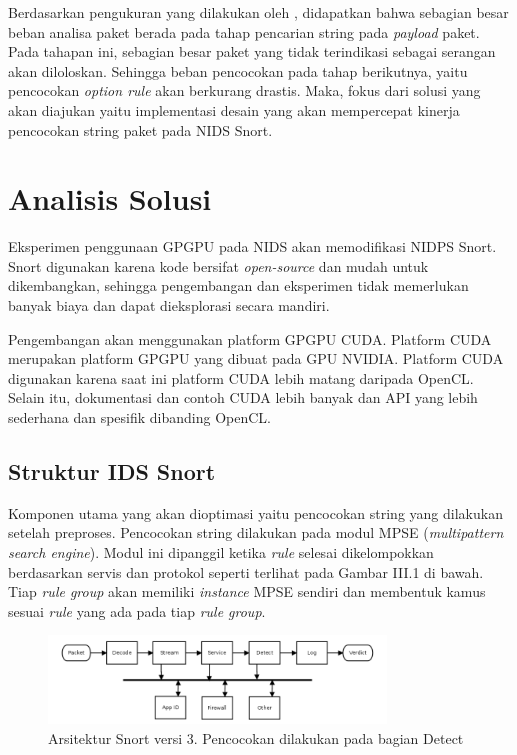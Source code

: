 
    Berdasarkan pengukuran yang dilakukan oleh \cite{kargus2012}, didapatkan bahwa sebagian besar beban analisa paket berada pada tahap pencarian string pada \emph{payload} paket. Pada tahapan ini, sebagian besar paket yang tidak terindikasi sebagai serangan akan diloloskan. Sehingga beban pencocokan pada tahap berikutnya, yaitu pencocokan \emph{option rule} akan berkurang drastis. Maka, fokus dari solusi yang akan diajukan yaitu implementasi desain yang akan mempercepat kinerja pencocokan string paket pada NIDS Snort.

  \section{Analisis Solusi}

    Eksperimen penggunaan GPGPU pada NIDS akan memodifikasi NIDPS Snort. Snort digunakan karena kode bersifat \emph{open-source} dan mudah untuk dikembangkan, sehingga pengembangan dan eksperimen tidak memerlukan banyak biaya dan dapat dieksplorasi secara mandiri. 

    Pengembangan akan menggunakan platform GPGPU CUDA. Platform CUDA merupakan platform GPGPU yang dibuat pada GPU NVIDIA. Platform CUDA digunakan karena saat ini platform CUDA lebih matang daripada OpenCL. Selain itu, dokumentasi dan contoh CUDA lebih banyak dan API yang lebih sederhana dan spesifik dibanding OpenCL.

    \subsection{Struktur IDS Snort}

      Komponen utama yang akan dioptimasi yaitu pencocokan string yang dilakukan setelah preproses. Pencocokan string dilakukan pada modul MPSE (\emph{multipattern search engine}). Modul ini dipanggil ketika \emph{rule} selesai dikelompokkan berdasarkan servis dan protokol seperti terlihat pada Gambar III.1 di bawah. Tiap \emph{rule group} akan memiliki \emph{instance} MPSE sendiri dan membentuk kamus sesuai \emph{rule} yang ada pada tiap \emph{rule group}.

      \begin{figure}[htb]
        \centering
        \includegraphics[width=0.8\textwidth]{resources/snort3.png}
        \caption[Arsitektur Snort versi 3]{Arsitektur Snort versi 3. Pencocokan dilakukan pada bagian Detect}
      \end{figure}

